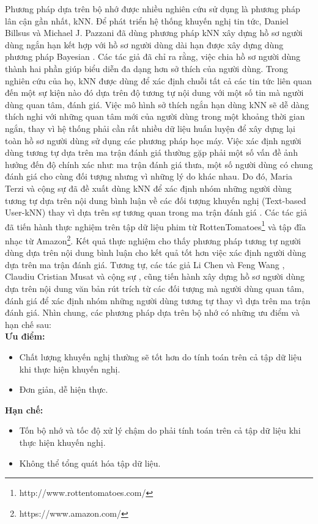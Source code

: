 Phương pháp dựa trên bộ nhớ được nhiều nghiên cứu sử dụng là phương pháp lân cận gần nhất, kNN. Để phát triển hệ thống khuyến nghị tin tức, Daniel Billsus và Michael J. Pazzani đã dùng phương pháp kNN xây dựng hồ sơ người dùng ngắn hạn kết hợp với hồ sơ người dùng dài hạn được xây dựng dùng phương pháp Bayesian \cite{Billsus:2000:UMA:598285.598352}. Các tác giả đã chỉ ra rằng, việc chia hồ sơ người dùng thành hai phần giúp biểu diễn đa dạng hơn sở thích của người dùng. Trong nghiên cứu của họ, kNN được dùng để xác định chuỗi tất cả các tin tức liên quan đến một sự kiện nào đó dựa trên độ tương tự nội dung với một số tin mà người dùng quan tâm, đánh giá. Việc mô hình sở thích ngắn hạn dùng kNN sẽ dễ dàng thích nghi với những quan tâm mới của người dùng trong một khoảng thời gian ngắn, thay vì hệ thống phải cần rất nhiều dữ liệu huấn luyện để xây dựng lại toàn hồ sơ người dùng sử dụng các phương pháp học máy. Việc xác định người dùng tương tự dựa trên ma trận đánh giá thường gặp phải một số vấn đề ảnh hưởng đến độ chính xác như: ma trận đánh giá thưa, một số người dùng có chung đánh giá cho cùng đối tượng nhưng vì những lý do khác nhau. Do đó, Maria Terzi và cộng sự đã đề xuất dùng kNN để xác định nhóm những người dùng tương tự dựa trên nội dung bình luận về các đối tượng khuyến nghị (Text-based User-kNN) thay vì dựa trên sự tương quan trong ma trận đánh giá \cite{TerziMaria2014}. Các tác giả đã tiến hành thực nghiệm trên tập dữ liệu phim từ RottenTomatoes\footnote{http://www.rottentomatoes.com/} và tập đĩa nhạc từ Amazon\footnote{https://www.amazon.com/}. Kết quả thực nghiệm cho thấy phương pháp tương tự người dùng dựa trên nội dung bình luận cho kết quả tốt hơn việc xác định người dùng dựa trên ma trận đánh giá. Tương tự, các tác giả Li Chen và Feng Wang \cite{ChenW13}, Claudiu Cristian Musat và cộng sự \cite{MusatLF13}, cũng tiến hành xây dựng hồ sơ người dùng dựa trên nội dung văn bản rút trích từ các đối tượng mà người dùng quan tâm, đánh giá để xác định nhóm những người dùng tương tự thay vì dựa trên ma trận đánh giá. Nhìn chung, các phương pháp dựa trên bộ nhớ có những ưu điểm và hạn chế sau:\\
\textbf{Ưu điểm:}
\begin{itemize}
	\item Chất lượng khuyến nghị thường sẽ tốt hơn do tính toán trên cả tập dữ liệu khi thực hiện khuyến nghị.
	\item Đơn giản, dễ hiện thực.
\end{itemize}	
\textbf{Hạn chế:}
\begin{itemize}
	\item Tốn bộ nhớ và tốc độ xử lý chậm do phải tính toán trên cả tập dữ liệu khi thực hiện khuyến nghị.
	\item Không thể tổng quát hóa tập dữ liệu.
\end{itemize}	

